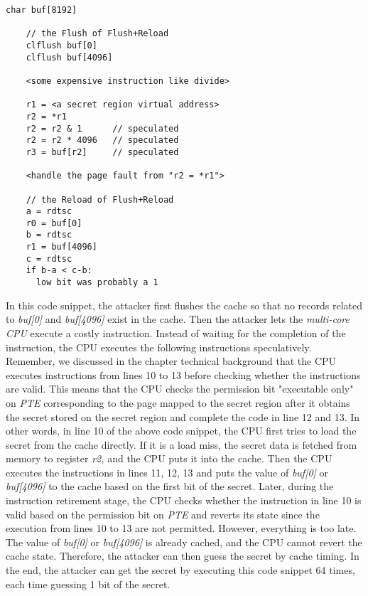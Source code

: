 \begin{lstlisting}[style=CStyle]
    char buf[8192]
  
    // the Flush of Flush+Reload
    clflush buf[0]
    clflush buf[4096]
  
    <some expensive instruction like divide>
  
    r1 = <a secret region virtual address>
    r2 = *r1
    r2 = r2 & 1      // speculated
    r2 = r2 * 4096   // speculated
    r3 = buf[r2]     // speculated
  
    <handle the page fault from "r2 = *r1">
  
    // the Reload of Flush+Reload
    a = rdtsc
    r0 = buf[0]
    b = rdtsc
    r1 = buf[4096]
    c = rdtsc
    if b-a < c-b:
      low bit was probably a 1
  \end{lstlisting}
  In this code snippet\cite{1}, the attacker first flushes the cache so that no 
  records related to \emph{buf[0]} and \emph{buf[4096]} exist in the cache. Then the 
  attacker lets the \emph{multi-core CPU} execute a costly instruction.  
  Instead of waiting for the completion of the instruction, the CPU 
  executes the following instructions speculatively. Remember, we discussed 
  in the chapter technical background that the CPU executes instructions 
  from lines 10 to 13 before checking whether the instructions are valid. 
  This means that the CPU checks the permission bit "executable only" on  
  \emph{PTE} corresponding to the page mapped to the secret region after it 
  obtains the secret stored on the secret region and complete the 
  code in line 12 and 13.  In other words,  in line 10 of the above 
  code snippet,  the CPU first tries to load the secret from the 
  cache directly. If it is a load miss, the secret data is fetched 
  from memory to register \emph{r2,} and the CPU puts it into the cache. 
  Then the CPU executes the instructions in lines 11, 12, 13 and 
  puts the value of \emph{buf[0]} or \emph{buf[4096]} to the cache based on 
  the first bit of the secret.  Later, during the instruction 
  retirement stage, the CPU checks whether the instruction in 
  line 10 is valid based on the permission bit on \emph{PTE} and reverts 
  its state since the execution from lines 10 to 13 are not permitted. 
  However, everything is too late. The value of \emph{buf[0]} or \emph{buf[4096]} 
  is already cached, and the CPU cannot revert the cache state. 
  Therefore, the attacker can then guess the secret by cache timing\cite{11}. 
  In the end, the attacker can get the secret by executing this code 
  snippet 64 times, each time guessing 1 bit of the secret.

